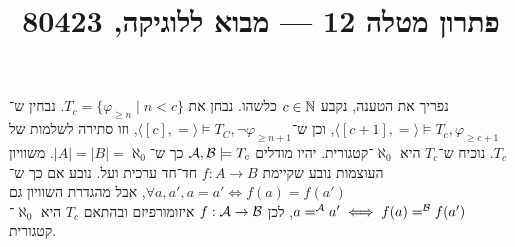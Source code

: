 
\title{פתרון מטלה 12 --- מבוא ללוגיקה, 80423}


\maketitle
\maketitleprint{}

\question[4]{}
נפריך את הטענה,
נקבע $c \in \mathbb{N}$ כלשהו.
נבחן את $T_c = \{ \varphi_{\ge n} \mid n < c \}$.
נבחין ש־$\langle [c + 1], = \rangle \models T_c, \varphi_{\ge c + 1}$, וכן ש־$\langle [c], = \rangle \models T_C, \lnot \varphi_{\ge n + 1}$, וזו סתירה לשלמות של $T_c$.
נוכיח ש־$T_c$ היא $\aleph_0$־קטגורית.
יהיו מודלים $\mathcal{A}, \mathcal{B} \models T_c$ כך ש־$|A| = |B| = \aleph_0$.
משוויון העוצמות נובע שקיימת $f : A \to B$ חד־חד ערכית ועל.
נובע אם כך ש־$\forall a, a', a = a' \iff f(a) = f(a')$, אבל מהגדרת השוויון גם $a =^{\mathcal{A}} a' \iff f(a) =^{\mathcal{B}} f(a')$, לכן $f : \mathcal{A} \to \mathcal{B}$ איזומורפיזם ובהתאם $T_c$ היא $\aleph_0$־קטגורית.


